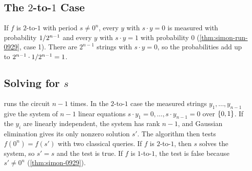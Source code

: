 \subsection{The \texorpdfstring{$2$}{2}-to-\texorpdfstring{$1$}{1} Case}

If $f$ is $2$-to-$1$ with period $s \neq 0^n$, every $y$ with $s \cdot y = 0$ is measured with
probability $1/2^{n-1}$ and every $y$ with $s \cdot y = 1$ with probability $0$
(\cref{thm:simon-run-0929}, case 1). There are $2^{n-1}$ strings with $s \cdot y = 0$, so the
probabilities add up to $2^{n-1} \cdot 1/2^{n-1} = 1$.

\subsection{Solving for \texorpdfstring{$s$}{s}}

 runs the circuit $n - 1$ times. In the $2$-to-$1$ case the measured strings
$y_1, \dots, y_{n-1}$ give the system of $n - 1$ linear equations
$s \cdot y_1 = 0, \dots, s \cdot y_{n-1} = 0$ over $\left\lbrace0,1\right\rbrace$. If the $y_i$ are linearly independent,
the system has rank $n - 1$, and Gaussian elimination gives its only nonzero solution $s'$. The
algorithm then tests $f(0^n) = f(s')$ with two classical queries. If $f$ is $2$-to-$1$, then $s$
solves the system, so $s' = s$ and the test is true. If $f$ is $1$-to-$1$, the test is false because
$s' \neq 0^n$ (\cref{thm:simon-0929}).


